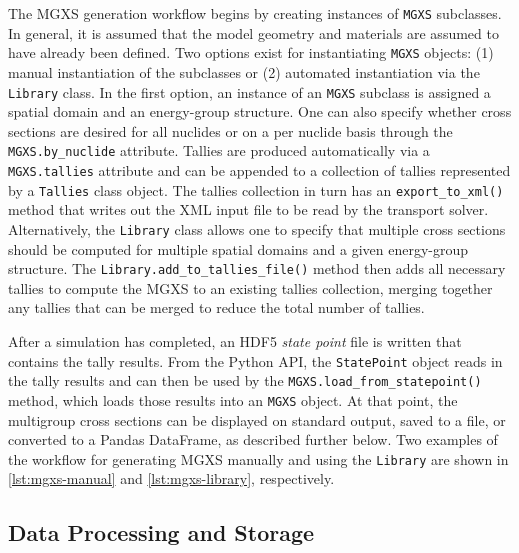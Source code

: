 The MGXS generation workflow begins by creating instances of \texttt{MGXS} subclasses. In general, it is assumed that the model geometry and materials are assumed to have already been defined. Two options exist for instantiating \texttt{MGXS} objects: (1) manual instantiation of the subclasses or (2) automated instantiation via the \texttt{Library} class. In the first option, an instance of an \texttt{MGXS} subclass is assigned a spatial domain and an energy-group structure. One can also specify whether cross sections are desired for all nuclides or on a per nuclide basis through the \texttt{MGXS.by_nuclide} attribute. Tallies are produced automatically via a \texttt{MGXS.tallies} attribute and can be appended to a collection of tallies represented by a \texttt{Tallies} class object. The tallies collection in turn has an \texttt{export_to_xml()} method that writes out the XML input file to be read by the transport solver. Alternatively, the \texttt{Library} class allows one to specify that multiple cross sections should be computed for multiple spatial domains and a given energy-group structure. The \texttt{Library.add_to_tallies_file()} method then adds all necessary tallies to compute the MGXS to an existing tallies collection, merging together any tallies that can be merged to reduce the total number of tallies.

After a simulation has completed, an HDF5 \emph{state point} file is written
that contains the tally results. From the Python API, the \texttt{StatePoint}
object reads in the tally results and can then be used by the
\texttt{MGXS.load_from_statepoint()} method, which loads those results into an
\texttt{MGXS} object. At that point, the multigroup cross sections can be displayed on standard output, saved to a file, or converted to a Pandas DataFrame, as described further below. Two examples of the workflow for generating MGXS manually and using the \texttt{Library} are shown in \cref{lst:mgxs-manual} and \cref{lst:mgxs-library}, respectively.






\subsection{Data Processing and Storage}
\label{subsec:data-processing}

